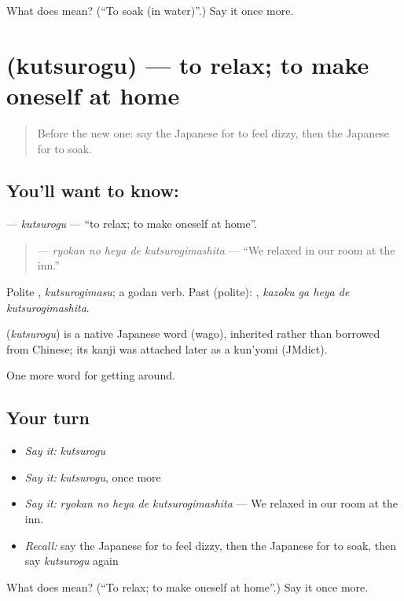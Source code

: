 \begin{tcolorbox}[breakable,colback=teal!4,colframe=teal!35!black,title={Before you move on}]
What does  mean? (\textquotedblleft{}To soak (in water)\textquotedblright{}.) Say it once more.
\end{tcolorbox}
\section[\texorpdfstring{\ja{くつろぐ} (kutsurogu)}{くつろぐ (kutsurogu)}]{ (kutsurogu) — to relax; to make oneself at home}

\label{lesson:JA-C398-kutsurogu}



\begin{quote}
Before the new one: say the Japanese for to feel dizzy, then the Japanese for to soak.
\end{quote}

\subsection*{You'll want to know: }
\textbf{} — \emph{kutsurogu} — \textquotedblleft{}to relax; to make oneself at home\textquotedblright{}.

\begin{quote}
\textbf{  } — \emph{ryokan no heya de kutsurogimashita} — \textquotedblleft{}We relaxed in our room at the inn.\textquotedblright{}
\end{quote}

Polite \textbf{}, \emph{kutsurogimasu}; a godan verb. Past (polite): \textbf{  }, \emph{kazoku ga heya de kutsurogimashita}.

\begin{cousinweb}
\textbf{} (\emph{kutsurogu}) is a native Japanese word (wago), inherited rather than borrowed from Chinese; its kanji was attached later as a kun'yomi (JMdict).
\end{cousinweb}

\begin{grammarlens}[title={What you've built}]
One more word for getting around.
\end{grammarlens}

\subsection*{Your turn}
\begin{itemize}
\raggedright
  \item \emph{Say it:} \emph{kutsurogu}
  \item \emph{Say it:} \emph{kutsurogu}, once more
  \item \emph{Say it:} \emph{ryokan no heya de kutsurogimashita} — We relaxed in our room at the inn.
  \item \emph{Recall:} say the Japanese for to feel dizzy, then the Japanese for to soak, then say \emph{kutsurogu} again
\end{itemize}

\begin{tcolorbox}[breakable,colback=teal!4,colframe=teal!35!black,title={Before you move on}]
What does  mean? (\textquotedblleft{}To relax; to make oneself at home\textquotedblright{}.) Say it once more.
\end{tcolorbox}
